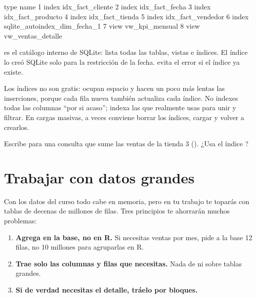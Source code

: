 \begin{rsalida}
   type                         name
1 index             idx_fact_cliente
2 index               idx_fact_fecha
3 index            idx_fact_producto
4 index              idx_fact_tienda
5 index            idx_fact_vendedor
6 index sqlite_autoindex_dim_fecha_1
7  view               vw_kpi_mensual
8  view            vw_ventas_detalle
\end{rsalida}

 es el catálogo interno de SQLite: lista todas las
tablas, vistas e índices. El índice  lo
creó SQLite solo para la restricción  de la fecha.
 evita el error si el índice ya existe.

\begin{advertencia}
Los índices no son gratis: ocupan espacio y hacen un poco más lentas las
inserciones, porque cada fila nueva también actualiza cada índice. No
indexes todas las columnas ``por si acaso''; indexa las que realmente usas
para unir y filtrar. En cargas masivas, a veces conviene borrar los
índices, cargar y volver a crearlos.
\end{advertencia}

\begin{hazlotu}
Escribe  para una consulta que sume las ventas
de la tienda 3 (). ¿Usa el índice
?
\end{hazlotu}

\section{Trabajar con datos grandes}
\label{sec:m5-grandes}

Con los datos del curso todo cabe en memoria, pero en tu trabajo te
toparás con tablas de decenas de millones de filas. Tres principios te
ahorrarán muchos problemas:

\begin{enumerate}
  \item \textbf{Agrega en la base, no en R.} Si necesitas ventas por mes,
        pide a la base 12 filas, no 10 millones para agruparlas en R.
  \item \textbf{Trae solo las columnas y filas que necesitas.} Nada de
         ni  sobre tablas grandes.
  \item \textbf{Si de verdad necesitas el detalle, tráelo por bloques.}
\end{enumerate}

